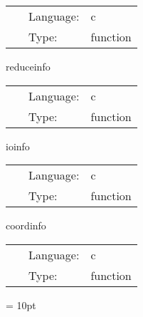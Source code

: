 \documentclass{article}
\begin{document}
\hspace{5mm}{\it information about interpolation operators } 


\hspace{5mm}

 \begin{tabular*}{160mm}{cll} 
~ & Language:  & c \\ 
~ & Type:  & function \\ 
\end{tabular*} 


\vspace{5mm}


\hspace{5mm} reduceinfo 

\hspace{5mm}{\it information about reduction operators } 


\hspace{5mm}

 \begin{tabular*}{160mm}{cll} 
~ & Language:  & c \\ 
~ & Type:  & function \\ 
\end{tabular*} 


\vspace{5mm}


\hspace{5mm} ioinfo 

\hspace{5mm}{\it information about io methods } 


\hspace{5mm}

 \begin{tabular*}{160mm}{cll} 
~ & Language:  & c \\ 
~ & Type:  & function \\ 
\end{tabular*} 


\vspace{5mm}


\hspace{5mm} coordinfo 

\hspace{5mm}{\it information about coordinate systems } 


\hspace{5mm}

 \begin{tabular*}{160mm}{cll} 
~ & Language:  & c \\ 
~ & Type:  & function \\ 
\end{tabular*} 



\vspace{5mm}\parskip = 10pt 
\end{document}
